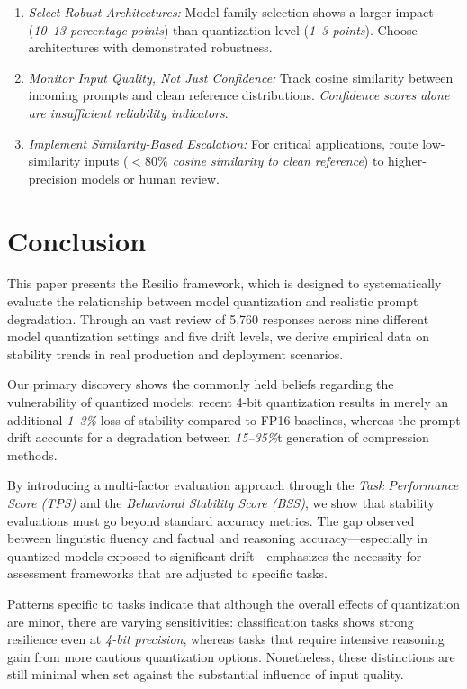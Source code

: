 \documentclass[conference]{IEEEtran}
\begin{document}
{\begin{enumerate}
\item \textit{Select Robust Architectures:} Model family selection shows a larger impact (\textit{10--13 percentage points}) than quantization level (\textit{1--3 points}). Choose architectures with demonstrated robustness.

\item \textit{Monitor Input Quality, Not Just Confidence:} Track cosine similarity between incoming prompts and clean reference distributions. \textit{Confidence scores alone are insufficient reliability indicators}.

\item \textit{Implement Similarity-Based Escalation:} For critical applications, route low-similarity inputs (\textit{$< 80\%$ cosine similarity to clean reference}) to higher-precision models or human review.
\end{enumerate}


\section{Conclusion}

This paper presents the Resilio framework, which is designed to systematically evaluate the relationship between model quantization and realistic prompt degradation. Through an vast review of 5{,}760 responses across nine different model quantization settings and five drift levels, we derive empirical data on stability trends in real production and deployment scenarios.

Our primary discovery shows the commonly held beliefs regarding the vulnerability of quantized models: recent 4-bit quantization results in merely an additional \textit{1--3\%} loss of stability compared to FP16 baselines, whereas the prompt drift accounts for a degradation between \textit{15--35\%}t generation of compression methods.

By introducing a multi-factor evaluation approach through the \textit{Task Performance Score (TPS)} and the \textit{Behavioral Stability Score (BSS)}, we show that stability evaluations must go beyond standard accuracy metrics. The gap observed between linguistic fluency and factual and reasoning accuracy—especially in quantized models exposed to significant drift—emphasizes the necessity for assessment frameworks that are adjusted to specific tasks.

Patterns specific to tasks indicate that although the overall effects of quantization are minor, there are varying sensitivities: classification tasks shows strong resilience even at \textit{4-bit precision}, whereas tasks that require intensive reasoning gain from more cautious quantization options. Nonetheless, these distinctions are still minimal when set against the substantial influence of input quality.

}
\end{document}

